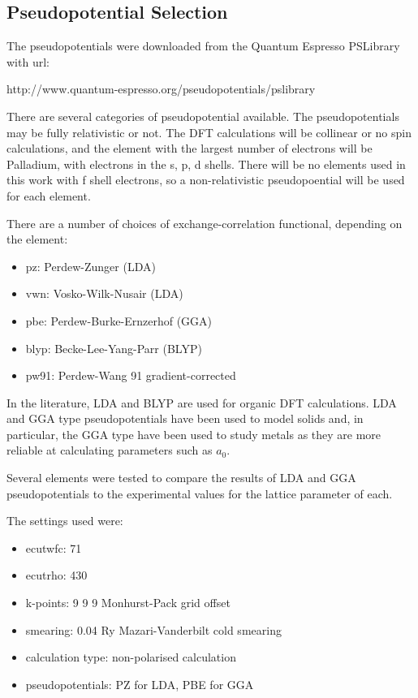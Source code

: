 \subsection{Pseudopotential Selection}

The pseudopotentials were downloaded from the Quantum Espresso PSLibrary with url:

http://www.quantum-espresso.org/pseudopotentials/pslibrary 

There are several categories of pseudopotential available.  The pseudopotentials may be fully relativistic or not.  The DFT calculations will be collinear or no spin calculations, and the element with the largest number of electrons will be Palladium, with electrons in the s, p, d shells.  There will be no elements used in this work with f shell electrons, so a non-relativistic pseudopoential will be used for each element.

There are a number of choices of exchange-correlation functional, depending on the element:

\begin{itemize}
\item pz: Perdew-Zunger (LDA)
\item vwn: Vosko-Wilk-Nusair (LDA)
\item pbe: Perdew-Burke-Ernzerhof (GGA)
\item blyp: Becke-Lee-Yang-Parr (BLYP)
\item pw91: Perdew-Wang 91 gradient-corrected 
\end{itemize}

In the literature, LDA and BLYP are used for organic DFT calculations.  LDA and GGA type pseudopotentials have been used to model solids and, in particular, the GGA type have been used to study metals as they are more reliable at calculating parameters such as $a_0$.

Several elements were tested to compare the results of LDA and GGA pseudopotentials to the experimental values for the lattice parameter of each.

The settings used were:

\begin{itemize}
\item ecutwfc: 71 
\item ecutrho: 430 
\item k-points: 9 9 9 Monhurst-Pack grid offset
\item smearing: 0.04 Ry Mazari-Vanderbilt cold smearing
\item calculation type: non-polarised calculation
\item pseudopotentials: PZ for LDA, PBE for GGA
\end{itemize}

